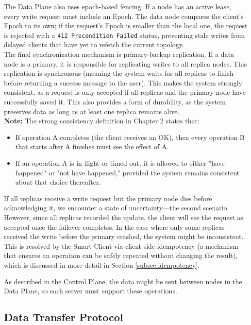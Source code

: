 \documentclass[shortabstract]{iithesis}
\begin{document}
The Data Plane also uses epoch-based fencing. If a node has an active lease, every write request must include an Epoch. The data node compares the client's Epoch to its own; if the request's Epoch is smaller than the local one, the request is rejected with a \texttt{412 Precondition Failed} status, preventing stale writes from delayed clients that have yet to refetch the current topology.\\

The final synchronization mechanism is primary-backup replication. If a data node is a primary, it is responsible for replicating writes to all replica nodes. This replication is synchronous (meaning the system waits for all replicas to finish before returning a success message to the user). This makes the system strongly consistent, as a request is only accepted if all replicas and the primary node have successfully saved it. This also provides a form of durability, as the system preserves data as long as at least one replica remains alive.\\

\noindent \textbf{Note:} \label{subsec:consistency_note} The strong consistency definition in Chapter 2 states that:
\begin{itemize}
    \item If operation A completes (the client receives an OK), then every operation B that starts after A finishes must see the effect of A.
    \item If an operation A is in-flight or timed out, it is allowed to either "have happened" or "not have happened," provided the system remains consistent about that choice thereafter.
\end{itemize}
If all replicas receive a write request but the primary node dies before acknowledging it, we encounter a state of uncertainty—the second scenario. However, since all replicas recorded the update, the client will see the request as accepted once the failover completes. In the case where only some replicas received the write before the primary crashed, the system might be inconsistent. This is resolved by the Smart Client via client-side idempotency (a mechanism that ensures an operation can be safely repeated without changing the result), which is discussed in more detail in Section \ref{subsec:idempotency}.

As described in the Control Plane, the data might be sent between nodes in the Data Plane, so each server must support these operations.

\subsection{Data Transfer Protocol} \label{subsec:data_transfer}
\end{document}
